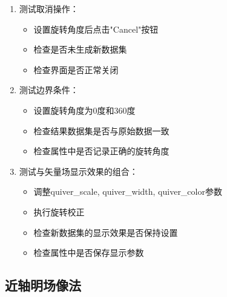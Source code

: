\documentclass[a4paper,12pt]{report}	%
\begin{document}
\begin{enumerate}
    \item 测试取消操作：
    \begin{itemize}
        \item 设置旋转角度后点击"Cancel"按钮
        \item 检查是否未生成新数据集
        \item 检查界面是否正常关闭
    \end{itemize}

    \item 测试边界条件：
    \begin{itemize}
        \item 设置旋转角度为0度和360度
        \item 检查结果数据集是否与原始数据一致
        \item 检查属性中是否记录正确的旋转角度
    \end{itemize}

    \item 测试与矢量场显示效果的组合：
    \begin{itemize}
        \item 调整quiver\_scale, quiver\_width, quiver\_color参数
        \item 执行旋转校正
        \item 检查新数据集的显示效果是否保持设置
        \item 检查属性中是否保存显示参数
    \end{itemize}
\end{enumerate}


\subsection{近轴明场像法}
\end{document}

